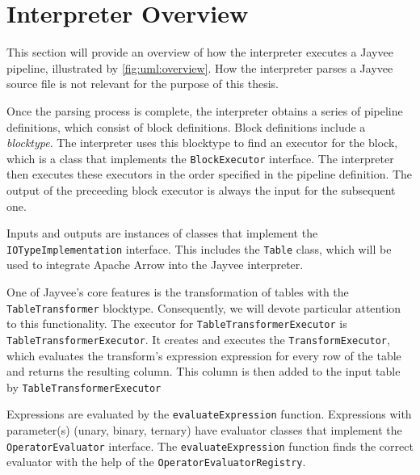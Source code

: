 \section{Interpreter Overview}
\label{section:prev}


This section will provide an overview of how the interpreter executes a Jayvee pipeline, illustrated by \ref{fig:uml:overview}.
How the interpreter parses a Jayvee source file is not relevant for the purpose of this thesis.

Once the parsing process is complete, the interpreter obtains a series of pipeline definitions, which consist of block definitions.
Block definitions include a \emph{blocktype}.
The interpreter uses this blocktype to find an executor for the block, which is a class that implements the \Verb|BlockExecutor| interface.
The interpreter then executes these executors in the order specified in the pipeline definition.
The output of the preceeding block executor is always the input for the subsequent one.

Inputs and outputs are instances of classes that implement the \Verb|IOTypeImplementation| interface.
This includes the \Verb|Table| class, which will be used to integrate Apache Arrow into the Jayvee interpreter.

One of Jayvee's core features is the transformation of tables with the \Verb|TableTransformer| blocktype.
Consequently, we will devote particular attention to this functionality.
The executor for \Verb|TableTransformerExecutor| is \Verb|TableTransformerExecutor|.
It creates and executes the \Verb|TransformExecutor|, which evaluates the transform's expression expression for every row of the table and returns the resulting column.
This column is then added to the input table by \Verb|TableTransformerExecutor|

Expressions are evaluated by the \Verb|evaluateExpression| function.
Expressions with parameter(s) (unary, binary, ternary) have evaluator classes that implement the \Verb|OperatorEvaluator| interface.
The \Verb|evaluateExpression| function finds the correct evaluator with the help of the \Verb|OperatorEvaluatorRegistry|.

